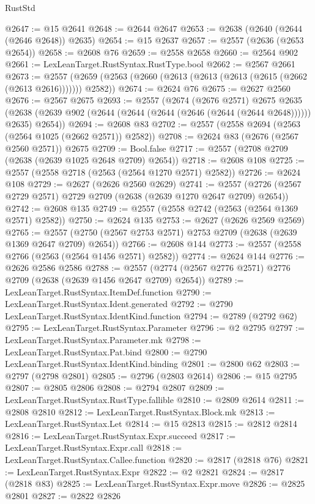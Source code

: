\begin{lexlean}{RustStd}
\begin{coremodule}
@2647 := @15 @2641
@2648 := @2644 @2647
@2653 := @2638 (@2640 (@2644 (@2646 @2648)) @2635)
@2654 := @15 @2637
@2657 := @2557 (@2636 (@2653 @2654))
@2658 := @2608 @76
@2659 := @2558 @2658
@2660 := @2564 @902
@2661 := LexLeanTarget.RustSyntax.RustType.bool
@2662 := @2567 @2661
@2673 := @2557 (@2659 (@2563 (@2660 (@2613 (@2613 (@2613 (@2615 (@2662 (@2613 @2616))))))) @2582))
@2674 := @2624 @76
@2675 := @2627 @2560
@2676 := @2567 @2675
@2693 := @2557
    (@2674
      (@2676 @2571)
      @2675
      @2635
      (@2638 (@2639 @902 (@2644 (@2644 (@2644 (@2646 (@2644 (@2644 @2648)))))) @2635) @2654))
@2694 := @2608 @83
@2702 := @2557 (@2558 @2694 (@2563 (@2564 @1025 (@2662 @2571)) @2582))
@2708 := @2624 @83 (@2676 (@2567 @2560 @2571)) @2675
@2709 := Bool.false
@2717 := @2557 (@2708 @2709 (@2638 (@2639 @1025 @2648 @2709) @2654))
@2718 := @2608 @108
@2725 := @2557 (@2558 @2718 (@2563 (@2564 @1270 @2571) @2582))
@2726 := @2624 @108
@2729 := @2627 (@2626 @2560 @2629)
@2741 := @2557 (@2726 (@2567 @2729 @2571) @2729 @2709 (@2638 (@2639 @1270 @2647 @2709) @2654))
@2742 := @2608 @135
@2749 := @2557 (@2558 @2742 (@2563 (@2564 @1369 @2571) @2582))
@2750 := @2624 @135
@2753 := @2627 (@2626 @2569 @2569)
@2765 := @2557 (@2750 (@2567 @2753 @2571) @2753 @2709 (@2638 (@2639 @1369 @2647 @2709) @2654))
@2766 := @2608 @144
@2773 := @2557 (@2558 @2766 (@2563 (@2564 @1456 @2571) @2582))
@2774 := @2624 @144
@2776 := @2626 @2586 @2586
@2788 := @2557 (@2774 (@2567 @2776 @2571) @2776 @2709 (@2638 (@2639 @1456 @2647 @2709) @2654))
@2789 := LexLeanTarget.RustSyntax.ItemDef.function
@2790 := LexLeanTarget.RustSyntax.Ident.generated
@2792 := @2790 LexLeanTarget.RustSyntax.IdentKind.function
@2794 := @2789 (@2792 @62)
@2795 := LexLeanTarget.RustSyntax.Parameter
@2796 := @2 @2795
@2797 := LexLeanTarget.RustSyntax.Parameter.mk
@2798 := LexLeanTarget.RustSyntax.Pat.bind
@2800 := @2790 LexLeanTarget.RustSyntax.IdentKind.binding
@2801 := @2800 @62
@2803 := @2797 (@2798 @2801)
@2805 := @2796 (@2803 @2614)
@2806 := @15 @2795
@2807 := @2805 @2806
@2808 := @2794 @2807
@2809 := LexLeanTarget.RustSyntax.RustType.fallible
@2810 := @2809 @2614
@2811 := @2808 @2810
@2812 := LexLeanTarget.RustSyntax.Block.mk
@2813 := LexLeanTarget.RustSyntax.Let
@2814 := @15 @2813
@2815 := @2812 @2814
@2816 := LexLeanTarget.RustSyntax.Expr.succeed
@2817 := LexLeanTarget.RustSyntax.Expr.call
@2818 := LexLeanTarget.RustSyntax.Callee.function
@2820 := @2817 (@2818 @76)
@2821 := LexLeanTarget.RustSyntax.Expr
@2822 := @2 @2821
@2824 := @2817 (@2818 @83)
@2825 := LexLeanTarget.RustSyntax.Expr.move
@2826 := @2825 @2801
@2827 := @2822 @2826

\end{coremodule}
\end{lexlean}
